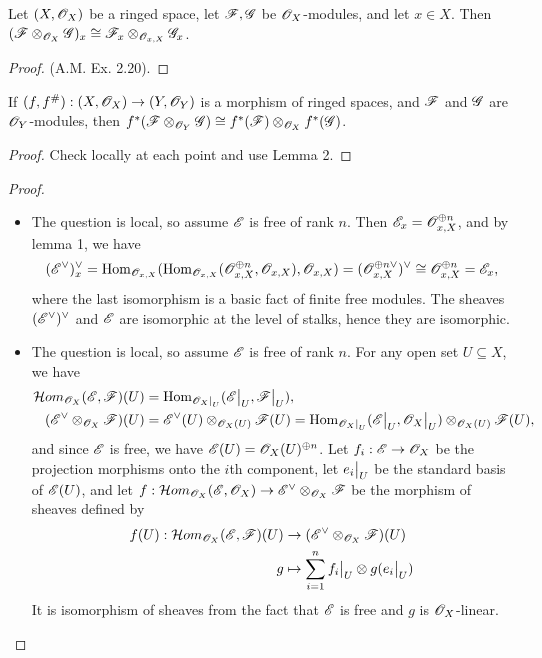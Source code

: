 \documentclass{article}
\begin{document}
\begin{enumerate} [label=\textbf{\arabic*.}, leftmargin=0em]
\begin{lemma}
    Let $(X, \mathscr{O}_X)$ be a ringed space, let $\mathscr{F}, \mathscr{G}$ be $\mathscr{O}_X$-modules, and let $x \in X$. Then $(\mathscr{F} \otimes_{\mathscr{O}_X} \mathscr{G})_x \cong \mathscr{F}_x \otimes_{\mathscr{O}_{x, X}} \mathscr{G}_x$.
\end{lemma}

\begin{proof}
    (A.M. Ex. 2.20).
\end{proof}

\begin{lemma}
    If $(f, f^\#) : (X, \mathscr{O}_X) \to (Y, \mathscr{O}_Y)$ is a morphism of ringed spaces, and $\mathscr{F}$ and $\mathscr{G}$ are $\mathscr{O}_Y$-modules, then $f^*(\mathscr{F} \otimes_{\mathscr{O}_Y} \mathscr{G}) \cong f^*(\mathscr{F}) \otimes_{\mathscr{O}_X} f^*(\mathscr{G})$.
\end{lemma}

\begin{proof}
    Check locally at each point and use Lemma 2.
\end{proof}

\begin{proof} $ $ \vspace{0pt}
\begin{itemize} [leftmargin=0em]
    \item[(a)] The question is local, so assume $\mathscr{E}$ is free of rank $n$. Then $\mathscr{E}_x = \mathscr{O}_{x, X}^{\oplus n}$, and by lemma 1, we have
    \begin{align*}
        (\mathscr{E}^\vee)^\vee_x = \operatorname{Hom}_{\mathscr{O}_{x, X}}(\operatorname{Hom}_{\mathscr{O}_{x, X}}(\mathscr{O}_{x, X}^{\oplus n}, \mathscr{O}_{x, X}), \mathscr{O}_{x, X}) = (\mathscr{O}_{x, X}^{\oplus n\vee})^\vee \cong \mathscr{O}_{x, X}^{\oplus n} = \mathscr{E}_x,
    \end{align*}
    where the last isomorphism is a basic fact of finite free modules. The sheaves $(\mathscr{E}^\vee)^\vee$ and $\mathscr{E}$ are isomorphic at the level of stalks, hence they are isomorphic.

    \item[(b)] The question is local, so assume $\mathscr{E}$ is free of rank $n$. For any open set $U \subseteq X$, we have
    \begin{align*}
        \mathcal{H}om_{\fO_X}(\fE, \fF)(U) & = \Hom_{\srestr{\fO_X}{U}}(\restr{\fE}{U}, \restr{\fF}{U}), \\
        (\fE^\vee \otimes_{\fO_X} \fF)(U) & = \fE^\vee(U) \otimes_{\fO_X(U)} \fF(U) = \Hom_{\srestr{\fO_X}{U}}(\restr{\fE}{U}, \restr{\fO_X}{U}) \otimes_{\fO_X(U)} \fF(U),
    \end{align*}
    and since $\mathscr{E}$ is free, we have $\mathscr{E}(U) = \mathscr{O}_X(U)^{\oplus n}$. Let $f_i : \mathscr{E} \to \mathscr{O}_X$ be the projection morphisms onto the $i$th component, let $\restr{e_i}{U}$ be the standard basis of $\mathscr{E}(U)$, and let $f : \mathcal{H}om_{\mathscr{O}_X}(\mathscr{E}, \mathscr{O}_X) \to \mathscr{E}^\vee \otimes_{\mathscr{O}_X} \mathscr{F}$ be the morphism of sheaves defined by
    \begin{align*}
        f(U) : \mathcal{H}om_{\fO_X}(\fE, \fF)(U) & \to (\fE^\vee \otimes_{\fO_X} \fF)(U) \\
        g & \mapsto \sum_{i = 1}^n \restr{f_i}{U} \otimes g(\restr{e_i}{U})
    \end{align*}
    It is isomorphism of sheaves from the fact that $\mathscr{E}$ is free and $g$ is $\mathscr{O}_X$-linear.


\end{itemize}
\end{proof}
\end{enumerate}
\end{document}
